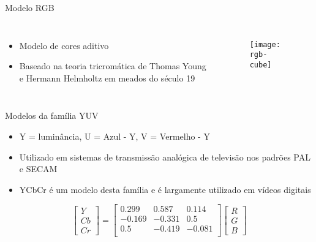 \begin{frame}{Modelo RGB}
\begin{columns}
\begin{itemize}
    \item Modelo de cores aditivo
    \item Baseado na teoria tricromática de Thomas Young e Hermann Helmholtz em meados do século 19
\end{itemize}
\begin{figure}[!h]
  \centering
  \texttt{[image: rgb-cube]}
\end{figure}
\end{columns}
\end{frame}

\begin{frame}{Modelos da família YUV}
\begin{itemize}
    \item Y = luminância, U = Azul - Y, V = Vermelho - Y
    \item Utilizado em sistemas de transmissão analógica de televisão nos padrões PAL e SECAM
    \item YCbCr é um modelo desta família e é largamente utilizado em vídeos digitais
\end{itemize}
\begin{equation*}
  \begin{bmatrix}
    Y \\ Cb \\ Cr
  \end{bmatrix} = 
  \begin{bmatrix}
     0.299 &  0.587 &  0.114 \\
    -0.169 & -0.331 &  0.5   \\
     0.5   & -0.419 & -0.081 \\
  \end{bmatrix}
  \begin{bmatrix}
    R \\ G \\ B
  \end{bmatrix}
\end{equation*}
\end{frame}

